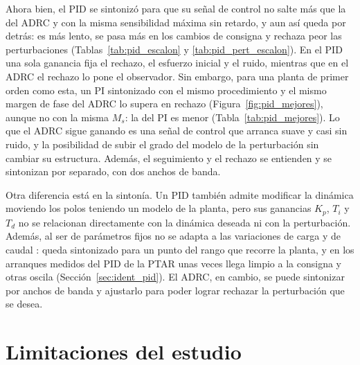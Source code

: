 Ahora bien, el PID se sintonizó para que su señal de control no salte más que la del ADRC y con la
misma sensibilidad máxima sin retardo, y aun así queda por detrás: es más lento, se pasa más en los
cambios de consigna y rechaza peor las perturbaciones (Tablas~\ref{tab:pid_escalon}
y \ref{tab:pid_pert_escalon}). En el PID una sola ganancia fija el rechazo, el esfuerzo inicial y el
ruido, mientras que en el ADRC el rechazo lo pone el observador. Sin embargo, para una planta de primer
orden como esta, un PI sintonizado con el mismo procedimiento y el mismo margen de fase del ADRC lo
supera en rechazo (Figura~\ref{fig:pid_mejores}), aunque no con la misma $M_s$: la del PI es menor
(Tabla~\ref{tab:pid_mejores}). Lo que el ADRC sigue ganando es una señal de control que arranca suave y casi
sin ruido, y la posibilidad de subir el grado del modelo de la perturbación sin cambiar su estructura.
Además, el seguimiento y el rechazo se entienden y se sintonizan por separado, con dos anchos de banda.

Otra diferencia está en la sintonía. Un PID también admite modificar la dinámica moviendo los polos
teniendo un modelo de la planta, pero sus ganancias $K_p$, $T_i$ y $T_d$ no se relacionan directamente
con la dinámica deseada ni con la perturbación. Además, al ser de parámetros fijos no se adapta a las
variaciones de carga y de caudal \cite{qiao2016self}: queda sintonizado para un punto del rango que
recorre la planta, y en los arranques medidos del PID de la PTAR unas veces llega limpio a la consigna
y otras oscila (Sección~\ref{sec:ident_pid}). El ADRC, en cambio, se puede sintonizar por anchos de
banda \cite{gao2003scaling} y ajustarlo para poder lograr rechazar la perturbación que se desea.

\section{Limitaciones del estudio}
\label{sec:limitaciones}

